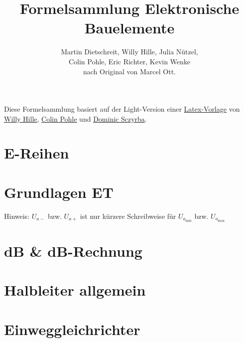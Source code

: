 

\hfuzz=10pt
\newcommand*{\bfrac}[2]{\genfrac{}{}{0pt}{}{#1}{#2}}
\setlength{\extrarowheight}{2pt}


\frontmatter
\title{Formelsammlung Elektronische Bauelemente}
\author{Martin Dietschreit, Willy Hille, Julia Nützel,\\
Colin Pohle, Eric Richter, Kevin Wenke\\
nach Original von Marcel Ott.}
\maketitle
\vfill
\scriptsize
Diese Formelsammlung basiert auf der Light-Version einer \href{https://github.com/DSczyrba/Vorlage-Latex/}{Latex-Vorlage} von \href{https://github.com/jemand771}{Willy Hille}, \href{https://github.com/TheColin21}{Colin Pohle} und \href{https://github.com/DSczyrba}{Dominic Sczyrba}.
\vfuzz=10pt
\tableofcontents
\vfuzz=0.1pt

\mainmatter
\section{E-Reihen}
    
\section{Grundlagen ET}
    
    Hinweis: $U_{a-}$ bzw. $U_{a+}$ ist nur kürzere Schreibweise für $U_{a_{\min}}$ bzw. $U_{a_{\max}}$
\section{dB \& dB-Rechnung} %
    
\section{Halbleiter allgemein}\label{sec:halbleiter}
    
\section{Einweggleichrichter}\label{sec:Einweggleichrichter}
    

